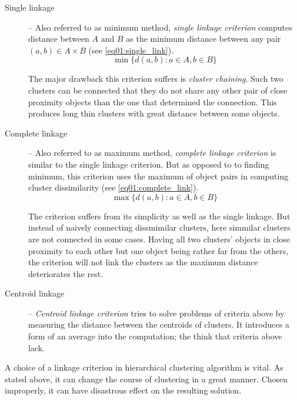 \begin{description}
	\item[Single linkage] -- Also referred to as minimum method, \emph{single linkage criterion} computes distance between $A$ and $B$ as the minimum distance between any pair $(a,b) \in A\times B$ (see  \ref{eq01:single_link}).
	\begin{equation}\label{eq01:single_link}
	\min\{d(a,b) : a \in A, b \in B\}
	\end{equation}
	
	The major drawback this criterion suffers is \emph{cluster chaining}. Such two clusters can be connected that they do not share any other pair of close proximity objects than the one that determined the connection. This produces long thin clusters with great distance between some objects.
	
	\item[Complete linkage] -- Also referred to as maximum method, \emph{complete linkage criterion} is similar to the single linkage criterion. But as opposed to to finding minimum, this criterion uses the maximum of object pairs in computing cluster dissimilarity (see \ref{eq01:complete_link}). 
	\begin{equation}\label{eq01:complete_link}
	\max\{d(a,b) : a \in A, b \in B\}
	\end{equation}
	
	The criterion suffers from its simplicity as well as the single linkage. But instead of naively connecting dissmimilar clusters, here simmilar clusters are not connected in some cases. Having all two clusters' objects in close proximity to each other but one object being rather far from the others, the criterion will not link the clusters as the maximum distance deteriorates the rest.
	
	\item[Centroid linkage] -- \emph{Centroid linkage criterion} tries to solve problems of criteria above by measuring the distance between the centroids of clusters. It introduces a form of an average into the computation; the think that criteria above lack.
\end{description}

A choice of a linkage criterion in hierarchical clustering algorithm is vital. As stated above, it can change the course of clustering in a great manner. Chosen improperly, it can have disastrous effect on the resulting solution.

